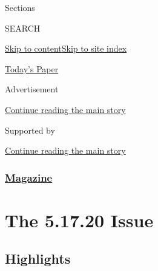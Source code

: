Sections

SEARCH

\protect\hyperlink{site-content}{Skip to
content}\protect\hyperlink{site-index}{Skip to site index}

\href{https://myaccount.nytimes3xbfgragh.onion/auth/login?response_type=cookie\&client_id=vi}{}

\href{https://www.nytimes3xbfgragh.onion/section/todayspaper}{Today's
Paper}

Advertisement

\protect\hyperlink{after-top}{Continue reading the main story}

Supported by

\protect\hyperlink{after-sponsor}{Continue reading the main story}

\hypertarget{magazine}{%
\subsubsection{\texorpdfstring{\href{/section/magazine}{Magazine}}{Magazine}}\label{magazine}}

\hypertarget{the-51720-issue}{%
\section{The 5.17.20 Issue}\label{the-51720-issue}}

\hypertarget{highlights}{%
\subsection{Highlights}\label{highlights}}

